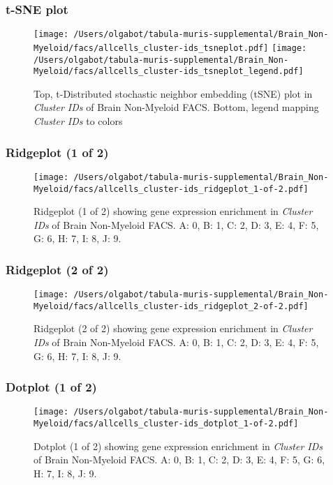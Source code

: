 \clearpage
\subsubsection{t-SNE plot}
\begin{figure}[h]
\centering
\texttt{[image: /Users/olgabot/tabula-muris-supplemental/Brain\_Non-Myeloid/facs/allcells\_cluster-ids\_tsneplot.pdf]}
\texttt{[image: /Users/olgabot/tabula-muris-supplemental/Brain\_Non-Myeloid/facs/allcells\_cluster-ids\_tsneplot\_legend.pdf]}
\caption{Top, t-Distributed stochastic neighbor embedding (tSNE) plot  in \emph{Cluster IDs} of Brain Non-Myeloid FACS. Bottom, legend mapping \emph{Cluster IDs} to colors}
\end{figure}


\clearpage

\subsubsection{Ridgeplot (1 of 2)}
\begin{figure}[h]
\centering
\texttt{[image: /Users/olgabot/tabula-muris-supplemental/Brain\_Non-Myeloid/facs/allcells\_cluster-ids\_ridgeplot\_1-of-2.pdf]}

\caption{ Ridgeplot (1 of 2)  showing gene expression enrichment in \emph{Cluster IDs} of Brain Non-Myeloid FACS. A: 0, B: 1, C: 2, D: 3, E: 4, F: 5, G: 6, H: 7, I: 8, J: 9.}
\end{figure}


\clearpage

\subsubsection{Ridgeplot (2 of 2)}
\begin{figure}[h]
\centering
\texttt{[image: /Users/olgabot/tabula-muris-supplemental/Brain\_Non-Myeloid/facs/allcells\_cluster-ids\_ridgeplot\_2-of-2.pdf]}

\caption{ Ridgeplot (2 of 2)  showing gene expression enrichment in \emph{Cluster IDs} of Brain Non-Myeloid FACS. A: 0, B: 1, C: 2, D: 3, E: 4, F: 5, G: 6, H: 7, I: 8, J: 9.}
\end{figure}


\clearpage

\subsubsection{Dotplot (1 of 2)}
\begin{figure}[h]
\centering
\texttt{[image: /Users/olgabot/tabula-muris-supplemental/Brain\_Non-Myeloid/facs/allcells\_cluster-ids\_dotplot\_1-of-2.pdf]}

\caption{ Dotplot (1 of 2)  showing gene expression enrichment in \emph{Cluster IDs} of Brain Non-Myeloid FACS. A: 0, B: 1, C: 2, D: 3, E: 4, F: 5, G: 6, H: 7, I: 8, J: 9.}
\end{figure}


